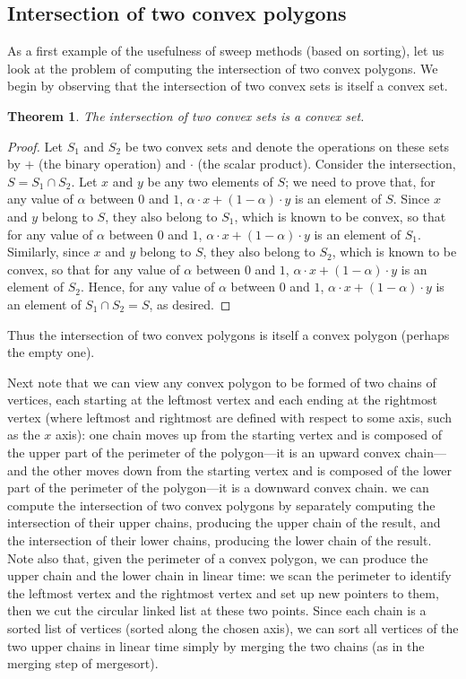 \documentclass[11pt]{article}
\newtheorem{theorem}{Theorem}
\begin{document}
\subsection{Intersection of two convex polygons}
As a first example of the usefulness of sweep methods (based on sorting),
let us look at the problem of computing the intersection of two convex
polygons.  We begin by observing that the intersection of two convex
sets is itself a convex set.
\begin{theorem}
  The intersection of two convex sets is a convex set.
\end{theorem}
\begin{proof}
  Let $S_1$ and $S_2$ be two convex sets and denote the operations
  on these sets by $+$ (the binary operation) and $\cdot$ (the scalar
  product).  Consider the intersection, $S=S_1 \cap S_2$.
  Let $x$ and $y$ be any two elements of $S$; we need to prove that,
  for any value of $\alpha$ between $0$ and $1$,
  $\alpha\cdot x + (1-\alpha)\cdot y$ is an element of $S$.
  Since $x$ and $y$ belong to $S$, they also belong to $S_1$, which
  is known to be convex, so that for any value of $\alpha$ between $0$ and $1$,
  $\alpha\cdot x + (1-\alpha)\cdot y$ is an element of $S_1$.
  Similarly, since $x$ and $y$ belong to $S$, they also belong to $S_2$, which
  is known to be convex, so that for any value of $\alpha$ between $0$ and $1$,
  $\alpha\cdot x + (1-\alpha)\cdot y$ is an element of $S_2$.
  Hence, for any value of $\alpha$ between $0$ and $1$,
  $\alpha\cdot x + (1-\alpha)\cdot y$ is an element of $S_1\cap S_2=S$, as
  desired.
\end{proof}
Thus the intersection of two convex polygons is itself a convex polygon
(perhaps the empty one).

Next note that we can view any convex polygon to be formed of two chains of
vertices, each starting at the leftmost vertex and each ending at the rightmost
vertex (where leftmost and rightmost are defined with respect to some axis,
such as the $x$ axis): one chain moves up from the starting vertex and is
composed of the upper part of the perimeter of the polygon---it is an upward
convex chain---and the other moves down from the starting vertex and is
composed of the lower part of the perimeter of the polygon---it is a downward
convex chain.  we can compute the intersection of two convex polygons
by separately computing the intersection of their upper chains, producing
the upper chain of the result, and the intersection of their lower chains,
producing the lower chain of the result.  Note also that, given the perimeter
of a convex polygon, we can produce the upper chain and the lower chain
in linear time: we scan the perimeter to identify the leftmost vertex and
the rightmost vertex and set up new pointers to them, then we cut the circular
linked list at these two points.  Since each chain is a sorted list of vertices
(sorted along the chosen axis), we can sort all vertices of the two upper chains
in linear time simply by merging the two chains (as in the merging step of
mergesort).
\end{document}
